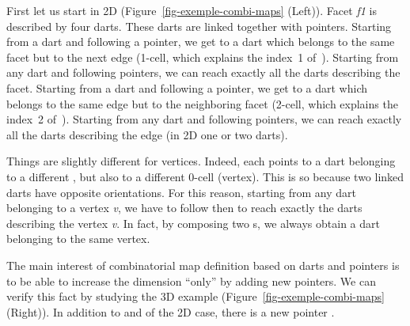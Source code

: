 First let us start in 2D (Figure~\ref{fig-exemple-combi-maps} (Left)).
Facet \emph{f1} is described by four darts. These darts are linked
together with pointers. Starting from a dart and following a \betaun{} %
pointer, we get to a dart which belongs to the same facet but to the
next edge (1-cell, which explains the index~1 of~\betaun{}).
Starting from any dart and following \betaun{} pointers, we can reach
exactly all the darts describing the facet.  Starting from a dart and
following a \betadeux{} pointer, we get to a dart which belongs to the
same edge but to the neighboring facet (2-cell, which explains the
index~2 of~\betadeux{}).  Starting from any dart and following
\betadeux{} pointers, we can reach exactly all the darts describing the
edge (in 2D one or two darts).

Things are slightly different for vertices.  Indeed, each \betai{}
points to a dart belonging to a different , but also to a
different 0-cell (vertex).  This is so because two linked darts have
opposite orientations.  For this reason, starting from any dart
belonging to a vertex \emph{v}, we have to follow \betadeux{} then \betaun{}
to reach exactly the darts describing the vertex \emph{v}.  In fact, by
composing two \betai{}s, we always obtain a dart belonging to the
same vertex.

The main interest of combinatorial map definition based on darts and
\betai{} pointers is to be able to increase the dimension ``only'' by
adding new pointers. We can verify this fact by studying the 3D
example (Figure~\ref{fig-exemple-combi-maps} (Right)). In addition to
\betaun{} and \betadeux{} of the 2D case, there is a new pointer
\betatrois{}.

